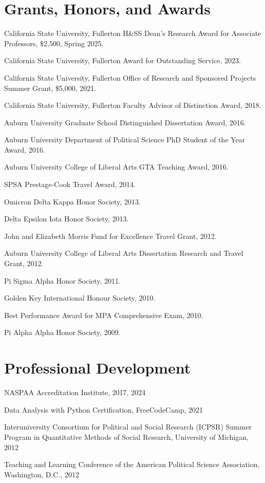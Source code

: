 \documentclass[12pt,letterpaper]{article}
\renewenvironment{itemize}{
  \begin{list}{}{
    \setlength{\leftmargin}{1.5em}
    \setlength{\itemsep}{0.25em}
    \setlength{\parskip}{0pt}
    \setlength{\parsep}{0.25em}
  }
}{
  \end{list}
}
\begin{document}
\section*{Grants, Honors, and Awards}
\begin{itemize}\leftmargin=2pt\itemindent=-15pt
  \item California State University, Fullerton H\&SS Dean's Research Award for Associate Professors, \$2,500, Spring 2025.
  \item California State University, Fullerton Award for Outstanding Service, 2023.
  \item California State University, Fullerton Office of Research and Sponsored Projects Summer Grant, \$5,000, 2021.
  \item California State University, Fullerton Faculty Advisor of Distinction Award, 2018.
  \item Auburn University Graduate School Distinguished Dissertation Award, 2016.
  \item Auburn University Department of Political Science PhD Student of the Year Award, 2016.
  \item Auburn University College of Liberal Arts GTA Teaching Award, 2016.
  \item SPSA Prestage-Cook Travel Award, 2014.
  \item Omicron Delta Kappa Honor Society, 2013.
  \item Delta Epsilon Iota Honor Society, 2013.
  \item John and Elizabeth Morris Fund for Excellence Travel Grant, 2012.
  \item Auburn University College of Liberal Arts Dissertation Research and Travel Grant, 2012.
  \item Pi Sigma Alpha Honor Society, 2011.
  \item Golden Key International Honour Society, 2010.
  \item Best Performance Award for MPA Comprehensive Exam, 2010.
  \item Pi Alpha Alpha Honor Society, 2009.
\end{itemize}

\section*{Professional Development}
\begin{itemize}\leftmargin=2pt\itemindent=-15pt
  \item NASPAA Accreditation Institute, 2017, 2024
  \item Data Analysis with Python Certification, FreeCodeCamp, 2021
  \item Interuniversity Consortium for Political and Social Research (ICPSR) Summer Program in Quantitative Methods of Social Research, University of Michigan, 2012
  \item Teaching and Learning Conference of the American Political Science Association, Washington, D.C., 2012
\end{itemize}
\end{document}
